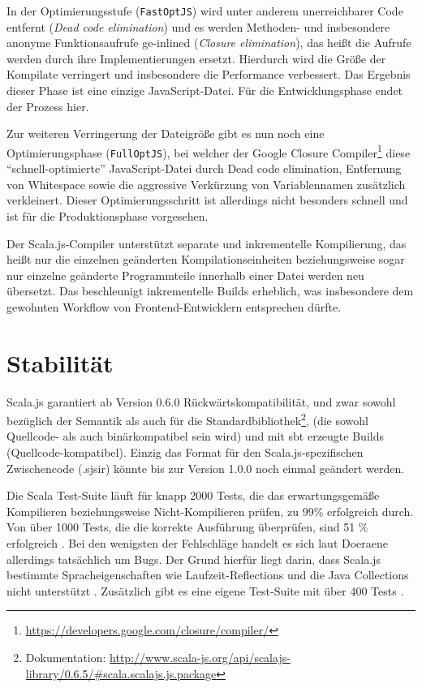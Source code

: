 \documentclass[a4paper, 12pt, hidelinks, listof=totoc, listoftables=totoc, bibliography=totoc]{scrreprt}
\newcommand{\code}[1]{\lstinline[language=Scala, style=inline]|#1|}
\begin{document}
In der Optimierungsstufe (\code{FastOptJS}) wird unter anderem unerreichbarer Code entfernt (\emph{Dead code elimination}) und es werden Methoden- und insbesondere anonyme Funktionsaufrufe ge-inlined (\emph{Closure elimination}), das heißt die Aufrufe werden durch ihre Implementierungen ersetzt. Hierdurch wird die Größe der Kompilate verringert und insbesondere die Performance verbessert. Das Ergebnis dieser Phase ist eine einzige JavaScript-Datei. Für die Entwicklungsphase endet der Prozess hier.

Zur weiteren Verringerung der Dateigröße gibt es nun noch eine Optimierungsphase (\code{FullOptJS}), bei welcher der Google Closure Compiler\footnote{\url{https://developers.google.com/closure/compiler/}} diese "`schnell-optimierte"' JavaScript-Datei durch Dead code elimination, Entfernung von Whitespace sowie die aggressive Verkürzung von Variablennamen zusätzlich verkleinert. Dieser Optimierungsschritt ist allerdings nicht besonders schnell und ist für die Produktionsphase vorgesehen. \cite{scalajs.DCO}\cite[\#HowCompilationWorks]{haoyi.HOS}

Der Scala.js-Compiler unterstützt separate und inkrementelle Kompilierung, das heißt nur die einzelnen geänderten Kompilationseinheiten beziehungsweise sogar nur einzelne geänderte Programmteile innerhalb einer Datei werden neu übersetzt. Das beschleunigt inkrementelle Builds erheblich, was insbesondere dem gewohnten Workflow von Frontend-Entwicklern entsprechen dürfte.


\section{Stabilität}

Scala.js garantiert ab Version 0.6.0 Rückwärtskompatibilität, und zwar sowohl bezüglich der Semantik als auch für die Standardbibliothek\footnote{Dokumentation: \url{http://www.scala-js.org/api/scalajs-library/0.6.5/\#scala.scalajs.js.package}}, (die sowohl Quellcode- als auch binärkompatibel sein wird) und mit sbt erzeugte Builds (Quellcode-kompatibel). Einzig das Format für den Scala.js-spezifischen Zwischencode (.sjsir) könnte bis zur Version 1.0.0 noch einmal geändert werden. \cite{doeraene2015.SNL}

Die Scala Test-Suite läuft für knapp 2000 Tests, die das erwartungsgemäße Kompilieren beziehungsweise Nicht-Kompilieren prüfen, zu 99\% erfolgreich durch. Von über 1000 Tests, die die korrekte Ausführung überprüfen, sind 51 \% erfolgreich \cite[Folie~36, Min.~35]{doeraene2014.WHB}. Bei den wenigsten der Fehlschläge handelt es sich laut Doeraene allerdings tatsächlich um Bugs. Der Grund hierfür liegt darin, dass Scala.js bestimmte Spracheigenschaften wie Laufzeit-Reflections und die Java Collections nicht unterstützt \cite[S.~7]{doeraene2013.TDI}. Zusätzlich gibt es eine eigene Test-Suite mit über 400 Tests \cite[Folie 36, Min. 35]{doeraene2014.WHB}.
\end{document}
